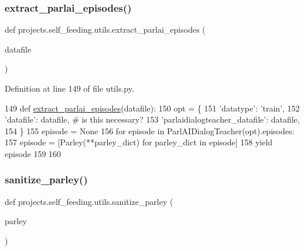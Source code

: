 \subsubsection{\texorpdfstring{extract\+\_\+parlai\+\_\+episodes()}{extract\_parlai\_episodes()}}
{\footnotesize\ttfamily def projects.\+self\+\_\+feeding.\+utils.\+extract\+\_\+parlai\+\_\+episodes (\begin{DoxyParamCaption}\item[{}]{datafile }\end{DoxyParamCaption})}



Definition at line 149 of file utils.\+py.


\begin{DoxyCode}
149 \textcolor{keyword}{def }\hyperlink{namespaceprojects_1_1self__feeding_1_1utils_a7bfa2fe610a2d0da7968b1a2662e0c23}{extract\_parlai\_episodes}(datafile):
150     opt = \{
151         \textcolor{stringliteral}{'datatype'}: \textcolor{stringliteral}{'train'},
152         \textcolor{stringliteral}{'datafile'}: datafile,  \textcolor{comment}{# is this necessary?}
153         \textcolor{stringliteral}{'parlaidialogteacher\_datafile'}: datafile,
154     \}
155     episode = \textcolor{keywordtype}{None}
156     \textcolor{keywordflow}{for} episode \textcolor{keywordflow}{in} ParlAIDialogTeacher(opt).episodes:
157         episode = [Parley(**parley\_dict) \textcolor{keywordflow}{for} parley\_dict \textcolor{keywordflow}{in} episode]
158         \textcolor{keywordflow}{yield} episode
159 
160 
\end{DoxyCode}
\mbox{\label{namespaceprojects_1_1self__feeding_1_1utils_a82b7afe0cb01d90b1de3724f3a6b23fb}} 
\subsubsection{\texorpdfstring{sanitize\+\_\+parley()}{sanitize\_parley()}}
{\footnotesize\ttfamily def projects.\+self\+\_\+feeding.\+utils.\+sanitize\+\_\+parley (\begin{DoxyParamCaption}\item[{}]{parley }\end{DoxyParamCaption})}


